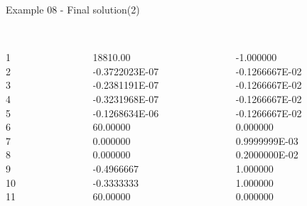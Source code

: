 \begin{frame}{Example 08 - Final solution(2)}
\footnotesize

\begin{columns}[t]
\begin{column}{0.3\textwidth}

\\
1\\
2\\
3\\
4\\
5\\
6\\
7\\
8\\
9\\
10\\
11\\

\end{column}
\begin{column}{0.3\textwidth}
\\
18810.00\\
-0.3722023E-07\\
-0.2381191E-07\\
-0.3231968E-07\\
-0.1268634E-06\\
60.00000\\
0.000000\\
0.000000\\
-0.4966667\\
-0.3333333\\
60.00000\\
\end{column}  

\begin{column}{0.3\textwidth}
\\
-1.000000\\
-0.1266667E-02\\
-0.1266667E-02\\
-0.1266667E-02\\
-0.1266667E-02\\
0.000000\\
0.9999999E-03\\
0.2000000E-02\\
1.000000\\
1.000000\\
0.000000\\

                           
\end{column}
\end{columns}  

\end{frame}


